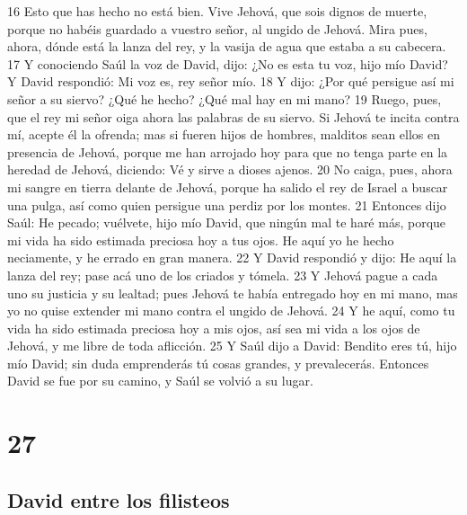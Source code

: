 {16 Esto que has hecho no está bien. Vive Jehová, que sois dignos de muerte, porque no habéis guardado a vuestro señor, al ungido de Jehová. Mira pues, ahora, dónde está la lanza del rey, y la vasija de agua que estaba a su cabecera.
17 Y conociendo Saúl la voz de David, dijo: ¿No es esta tu voz, hijo mío David? Y David respondió: Mi voz es, rey señor mío.
18 Y dijo: ¿Por qué persigue así mi señor a su siervo? ¿Qué he hecho? ¿Qué mal hay en mi mano?
19 Ruego, pues, que el rey mi señor oiga ahora las palabras de su siervo. Si Jehová te incita contra mí, acepte él la ofrenda; mas si fueren hijos de hombres, malditos sean ellos en presencia de Jehová, porque me han arrojado hoy para que no tenga parte en la heredad de Jehová, diciendo: Vé y sirve a dioses ajenos.
20 No caiga, pues, ahora mi sangre en tierra delante de Jehová, porque ha salido el rey de Israel a buscar una pulga, así como quien persigue una perdiz por los montes.
21 Entonces dijo Saúl: He pecado; vuélvete, hijo mío David, que ningún mal te haré más, porque mi vida ha sido estimada preciosa hoy a tus ojos. He aquí yo he hecho neciamente, y he errado en gran manera.
22 Y David respondió y dijo: He aquí la lanza del rey; pase acá uno de los criados y tómela.
23 Y Jehová pague a cada uno su justicia y su lealtad; pues Jehová te había entregado hoy en mi mano, mas yo no quise extender mi mano contra el ungido de Jehová.
24 Y he aquí, como tu vida ha sido estimada preciosa hoy a mis ojos, así sea mi vida a los ojos de Jehová, y me libre de toda aflicción.
25 Y Saúl dijo a David: Bendito eres tú, hijo mío David; sin duda emprenderás tú cosas grandes, y prevalecerás. Entonces David se fue por su camino, y Saúl se volvió a su lugar.

\chapter{27}

\section*{David entre los filisteos}

}
